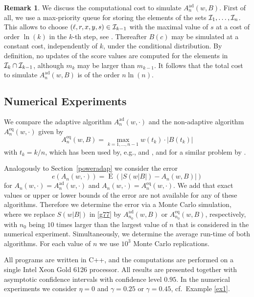 \documentclass[a4paper]{amsart}
\theoremstyle{definition}
\newtheorem{rem}[exmp]{Remark}
\theoremstyle{plain}
\newcommand{\E}{\operatorname{E}}
\newcommand{\I}{\ensuremath \mathcal I}
\newcommand{\adap}{\ensuremath{ \mathrm{ad} }}
\newcommand{\equi}{\ensuremath{ \mathrm{eq} }}
\begin{document}
\begin{rem}\label{r6}
We discuss the computational cost to simulate $A^\adap_n(w,B)$.
First of all, we use a max-priority queue for storing the elements of
the sets $\I_1,\dots,\I_n$. This allows to choose
$(\ell,r,x,y,s)\in \I_{k-1}$ with the maximal value of $s$ at a
cost of order $\ln(k)$ in the $k$-th step, see
\citet*[Sec.~6.5]{cormen2009introduction}. Thereafter $B(c)$ may be
simulated at a constant cost, independently of $k$,
under the conditional distribution. By definition, no updates
of the score values are computed for the elements in $\I_k \cap
\I_{k-1}$, although $m_k$ may be larger than $m_{k-1}$.
It follows that the total cost to simulate $A^\adap_n(w,B)$
is of the order $n \ln(n)$.
\end{rem}

\subsection{Numerical Experiments}\label{strongnumeriocs}

We compare the adaptive algorithm $A^\adap_n(w,\cdot)$
and the non-adaptive algorithm $A^\equi_n(w,\cdot)$ given by
\[
A_n^\equi (w,B) = \max_{k=1,\dots,n-1} w(t_{k})
\cdot |B(t_{k})|
\]
with $t_{k} = k/n$, which has been used by, e.g.,
\citet*{EastwoodEastwood98} and \citet*{OraschPouliot04},
and for a similar problem by \citet*{AkashiEtAl18}.

Analogously to Section~\ref{poweradap} we consider the error
\begin{equation}\label{g77}
e(A_n(w,\cdot)) = \E \left(|S(w|B|) - A_n(w,B)|\right)
\end{equation}
for $A_n(w,\cdot) = A_n^\adap(w,\cdot)$ and
$A_n(w,\cdot) = A_n^\equi(w,\cdot)$.
We add that exact values or upper or lower bounds
of the error
are not available for any of these algorithms.
Therefore we determine the error via
a Monte Carlo simulation, where we replace $S(w|B|)$
in \eqref{g77} by
$A^\adap_{n_0}(w,B)$ or $A^\equi_{n_0}(w,B)$,
respectively,
with $n_0$ being $10$ times larger than the largest value of $n$
that is considered in the numerical experiment.
Simultaneously, we determine the average run-time of both
algorithms.
For each value of $n$ we use $10^3$ Monte Carlo replications.

All programs are written in C++,
and the computations are performed on
a single Intel Xeon Gold 6126 processor.
All results are presented together with asymptotic confidence
intervals with confidence level $0.95$.
In the numerical experiments we consider $\eta = 0$ and
$\gamma=0.25$ or $\gamma=0.45$, cf.\ Example \ref{ex1}.
\end{document}

